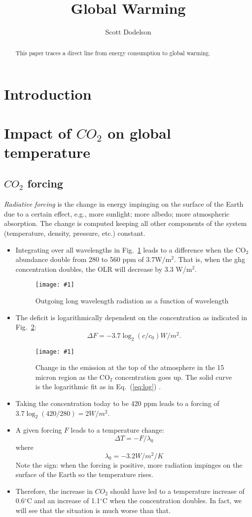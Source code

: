 \documentclass[tsecnumarabic,amssymb, nobibnotes, aps, prd]{revtex4-2}
\def\be{\begin{equation}}
\def\ee{\end{equation}}
\newcommand{\ec}[1]{Eq.~(\ref{eq:#1})}
\newcommand{\eql}[1]{\label{eq:#1}}
\newcommand{\sfig}[2]{
\texttt{[image: \#1]}
        }
\newcommand{\Spng}[2]{
   \begin{figure}[thbp]
   \begin{center}
    \sfig{Figures/#1.png}{0.8\columnwidth}
    \caption{{\small #2}}
    \label{fig:#1}
     \end{center}
   \end{figure}
}
\newcommand{\rf}[1]{\ref{fig:#1}}
\newcommand\bei{\begin{itemize}}
\newcommand\eei{\end{itemize}}
\begin{document}
\title{Global Warming}
\author{Scott Dodelson}
\begin{abstract}
This paper traces a direct line from energy consumption to global warming.
\end{abstract}

\maketitle

\section{Introduction}

\section{Impact of $CO_2$ on global temperature}

\subsection{$CO_2$ forcing}
 {\it Radiative forcing} is the change in energy impinging on the surface of the Earth due to a certain effect, e.g., more sunlight; more albedo; more atmospheric absorption. The change is computed keeping all other components of the system (temperature, density, pressure, etc.) constant.  
\bei
\item Integrating over all wavelengths in Fig.~\rf{olr} leads to a difference when the CO$_2$ abundance double from 280 to 560 ppm of 3.7W/m$^2$. That is, when the ghg concentration doubles, the OLR will decrease by 3.3 W/m$^2$. 
\Spng{olr}{Outgoing long wavelength radiation as a function of wavelength}
\item The deficit is logarithmically dependent on the concentration as indicated in Fig.~\rf{olrlog}:
\be
\Delta F = -3.7\log_2(c/c_0) W/m^2.\eql{log}\ee 
\Spng{olrlog}{Change in the emission at the top of the atmosphere in the 15 micron region as the CO$_2$ concentration goes up. The solid curve is the logarithmic fit as in \ec{log} .}
\item Taking the concentration today to be 420 ppm leads to a forcing of $3.7\log_2(420/280)=2 W/m^2$. 
\item A given forcing $F$ leads to a temperature change:
\be
\Delta T = -F/\lambda_0
\ee
where
\be
\lambda_0=-3.2 W/m^2/K\eql{lambda}\ee
Note the sign: when the forcing is positive, more radiation impinges on the surface of the Earth so the temperature rises.
\item Therefore, the increase in $CO_2$ should have led to a temperature increase of 0.6$^\circ$C and an increase of 1.1$^\circ$C when the concentration doubles. In fact, we will see that the situation is much worse than that.
\eei
\end{document}
